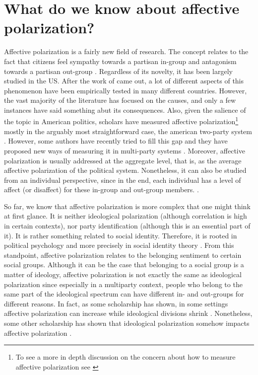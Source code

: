 \documentclass[a4paper, svgnames]{article}
\begin{document}
\section{What do we know about affective polarization?}
\label{affective polarization}

Affective polarization is a fairly new field of research. The concept relates to the fact that citizens feel sympathy towards a partisan in-group and antagonism towards a partisan out-group \citep{Wagner2021}. Regardless of its novelty, it has been largely studied in the US. After the work of \cite{Iyengar2012} came out, a lot of different aspects of this phenomenon have been empirically tested in many different countries. However, the vast majority of the literature has focused on the causes, and only a few instances have said something abut its consequences. Also, given the salience of the topic in American politics, scholars have measured affective polarization\footnote{To see a more in depth discussion on the concern about how to measure affective polarization see \cite{Druckman2019}} mostly in the arguably most straightforward case, the american two-party system \citep{Wagner2021}. However, some authors have recently tried to fill this gap and they have proposed new ways of measuring it in multi-party systems \citep{Reiljan2020}. Moreover, affective polarization is usually addressed at the aggregate level, that is, as the average affective polarization of the political system. Nonetheless, it can also be studied from an individual perspective, since in the end, each individual has a level of affect (or disaffect) for these in-group and out-group members. \citep{Wagner2021}.

So far, we know that affective polarization is more complex that one might think at first glance. It is neither ideological polarization (although correlation is high in certain contexts), nor party identification (although this is an essential part of it). It is rather something related to social identity. Therefore, it is rooted in political psychology and more precisely in social identity theory \citep{Tajfel1979}. From this standpoint, affective polarization relates to the belonging sentiment to certain social groups. Although it can be the case that belonging to a social group is a matter of ideology, affective polarization is not exactly the same as ideological polarization since especially in a multiparty context, people who belong to the same part of the ideological spectrum can have different in- and out-groups for different reasons. In fact, as some scholarship has shown, in some settings affective polarization can increase while ideological divisions shrink \citep{Levendusky2016, Iyengar2019}. Nonetheless, some other scholarship has shown that ideological polarization somehow impacts affective polarization \citep{Rogowski2016a, Webster2017}.
\end{document}
